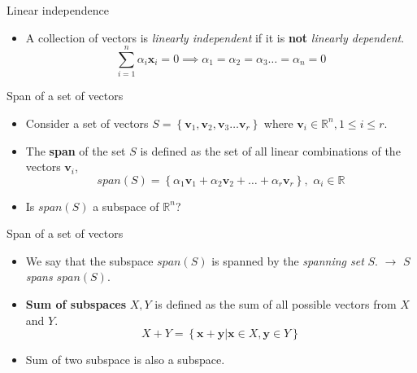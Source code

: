 \documentclass[aspectratio=169]{beamer}
\let\olditem\item
\renewcommand{\item}{\setlength{\itemsep}{\fill}\olditem}
\begin{document}
\begin{frame}[t]{Linear independence}
\begin{itemize}  
  \item A collection of vectors is \textit{linearly independent} if it is \textbf{not} \textit{linearly dependent}.
  $$ \sum_{i=1}^n\alpha_i\mathbf{x}_i = 0 \implies \alpha_1=\alpha_2=\alpha_3\ldots=\alpha_n = 0$$
\end{itemize}
\end{frame}


\begin{frame}[t]{Span of a set of vectors}
\begin{itemize}
    \item Consider a set of vectors $S = \left\{\mathbf{v}_1, \mathbf{v}_2, \mathbf{v}_3 \ldots \mathbf{v}_r\right\}$ where $\mathbf{v}_i \in \mathbb{R}^n, 1 \leq i \leq r$.
    \item The \textbf{span} of the set $S$ is defined as the set of all linear combinations of the vectors $\mathbf{v}_i$,
    \[ span\left(S\right) = \left\{\alpha_1\mathbf{v}_1 + \alpha_2\mathbf{v}_2 + \ldots + \alpha_r\mathbf{v}_r\right\}, \,\, \alpha_i \in \mathbb{R} \]
    \item Is $span\left(S\right)$ a subspace of $\mathbb{R}^n$?
\end{itemize}
\end{frame}


\begin{frame}[t]{Span of a set of vectors}
\begin{itemize}
    \item We say that the subspace $span\left(S\right)$ is spanned by the \textit{spanning set} $S$. $\longrightarrow$ $S$ \textit{spans} $span\left(S\right)$.
    \item \textbf{Sum of subspaces} $X, Y$ is defined as the sum of all possible vectors from $X$ and $Y$.
    \[ X + Y = \left\{\mathbf{x} + \mathbf{y} \left|\right. \mathbf{x} \in X, \mathbf{y} \in Y\right\} \]
    \item Sum of two subspace is also a subspace.
\end{itemize}
\end{frame}
\end{document}
